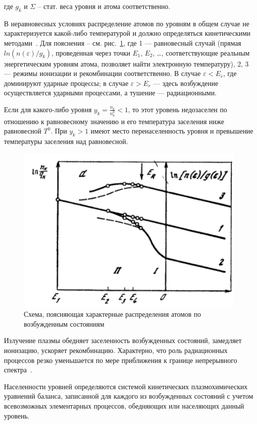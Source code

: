 \documentclass[10pt, a4paper]{article}
\begin{document}
где $g_k$ и $\Sigma$ -- стат. веса уровня и атома соответственно.

В неравновесных условиях распределение атомов по уровням в общем случае не характеризуется какой-либо температурой и должно определяться кинетическими методами~\cite{biberman}. Для пояснения -- см. рис.~\ref{fig:excited_molecules}, где 1 — равновесный случай (прямая $ln(n(\varepsilon)/g_k)$, проведенная через точки $E_1$, $E_2$, \ldots, соответствующие реальным энергетическим уровням атома, позволяет найти электронную температуру), 2, 3 — режимы ионизации и рекомбинации соответственно. В случае $\varepsilon<E_r$, где доминируют ударные процессы; в случае $\varepsilon>E_r$ — здесь возбуждение осуществляется ударными процессами, а тушение — радиационными.

Если для какого-либо уровня $y_k=\frac{n_k}{n_k^0}<1$, то этот уровень недозаселен по отношению к равновесному значению и его температура заселения ниже равновесной $T^0$. При $y_k>1$ имеют место перенаселенность уровня и превышение температуры заселения над равновесной. 

\begin{figure}[ht]
	\begin{center}
		\includegraphics[width=0.5\linewidth]{excited_molecules.png}
	\end{center}
	\caption{Схема, поясняющая характерные распределения атомов по возбужденным состояниям~\cite{biberman}}
	\label{fig:excited_molecules}
\end{figure}

Излучение плазмы обедняет заселенность возбужденных состояний, замедляет ионизацию, ускоряет рекомбинацию. Характерно, что роль радиационных процессов резко уменьшается по мере приближения к границе непрерывного спектра~\cite{biberman}.

Населенности уровней определяются системой кинетических плазмохимических уравнений баланса, записанной для каждого из возбужденных состояний с учетом всевозможных элементарных процессов, обедняющих или населяющих данный уровень.
\end{document}
